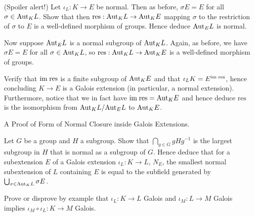 \documentclass[../book.tex]{subfiles}
\begin{document}
\begin{ex} (Spoiler alert!)
    Let $\iota_L : K \to E$ be normal.
    Then as before, $\sigma E = E$ for all $\sigma \in \mathrm{Aut}_{K}L$.
    Show that then $\mathrm{res} : \mathrm{Aut}_{K}L \to \mathrm{Aut}_{K}E$
    mapping $\sigma$ to the restriction of $\sigma$ to $E$ 
    is a well-defined morphism of groups.
    Hence deduce $\mathrm{Aut}_{E}L$ is normal. 

    Now suppose $\mathrm{Aut}_{E}L$ is a normal subgroup of $\mathrm{Aut}_{K}L$.
    Again, as before, we have $\sigma E = E$ for all $\sigma \in \mathrm{Aut}_{K}L$,
    so $\mathrm{res} : \mathrm{Aut}_{K}L \to \mathrm{Aut}_{K}E$ is a well-defined morphism of groups.
    
    Verify that $\textnormal{im}\;\mathrm{res}$ is a finite subgroup of $\mathrm{Aut}_{K}E$
    and that $\iota_L K = E^{\textnormal{im}\; \mathrm{res}}$,
    hence concluding $K \to E$ is a Galois extension
    (in particular, a normal extension).
    Furthermore, notice that we in fact have $\textnormal{im}\;\mathrm{res} = \mathrm{Aut}_{K}E$
    and hence deduce $\mathrm{res}$ is the isomorphism
    from $\mathrm{Aut}_{K}L / \mathrm{Aut}_{E}L$ to $\mathrm{Aut}_{K}E$.
\end{ex}

\begin{ex} A Proof of Form of Normal Closure inside Galois Extensions.
    
    Let $G$ be a group and $H$ a subgroup. 
    Show that $\bigcap_{g \in G} g H g^{-1}$ is the largest subgroup in $H$
    that is normal as a subgroup of $G$.
    Hence deduce that for a subextension $E$ 
    of a Galois extension $\iota_L : K \to L$, 
    $N_E$, the smallest normal subextension of $L$ containing $E$ 
    is equal to the subfield generated by $\bigcup_{\sigma \in \mathrm{Aut}_{K}L} \sigma E$. 
    
\end{ex}

\begin{ex}
    
    Prove or disprove by example that
    $\iota_L : K \to L$ Galois and $\iota_M : L \to M$ Galois
    implies $\iota_M \circ \iota_L : K \to M$ Galois. 
    
\end{ex}
\end{document}
